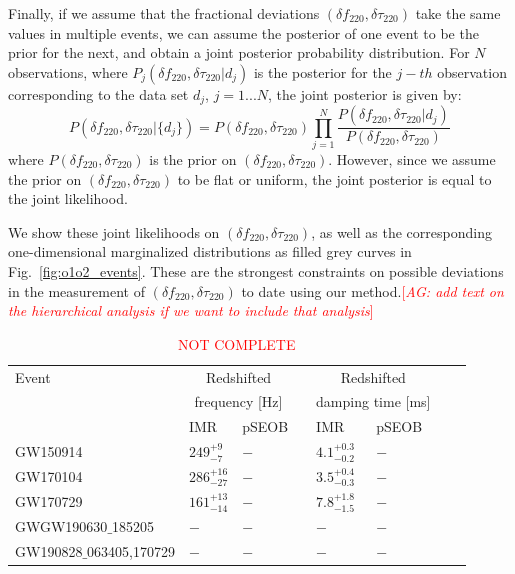 \documentclass[twocolumn,prd,aps,superscriptaddress,preprintnumbers,tightenlines,showpacs,nofootinbib,eqsecnum,amsfonts,amsmath]{revtex4-1}
\newcommand{\abhi}[1]{\textcolor{red}{[\textit{AG: #1}]}}
\newcommand{\df}[1]{\delta f_{\text{#1}}}
\newcommand{\dtau}[1]{\delta \tau_{\text{#1}}}
\begin{document}
Finally, if we assume that the fractional deviations $(\df{220}, \dtau{220})$ take the same values in multiple events, we can assume the posterior of one event to be the prior for the next, and obtain a joint posterior probability distribution. For $N$ observations, where $P_j(\df{220}, \dtau{220} | d_j)$ is the posterior for the $j-th$ observation corresponding to the data set $d_j$, $j=1...N$, the joint posterior is given by:
\begin{equation}
P(\df{220}, \dtau{220} | \{d_j\}) = P(\df{220}, \dtau{220}) \prod _{j=1}^N \frac{P(\df{220}, \dtau{220} | d_j) }{P(\df{220}, \dtau{220})}
\end{equation}
where $P(\df{220}, \dtau{220})$ is the prior on $(\df{220}, \dtau{220})$. However, since we assume the prior on $(\df{220}, \dtau{220})$ to be flat or uniform, the joint posterior is equal to the joint likelihood.

We show these joint likelihoods on $(\df{220}, \dtau{220})$, as well as the corresponding one-dimensional marginalized distributions as filled grey curves in Fig.~\ref{fig:o1o2_events}. These are the strongest constraints on possible deviations in the measurement of $(\df{220}, \dtau{220})$ to date using our method.\abhi{add text on the hierarchical analysis if we want to include that analysis}

\begin{table}
\begin{flushleft}
\begin{tabular}{llllllll}
\toprule
Event & \multicolumn{2}{c}{Redshifted} & \hphantom{X} & \multicolumn{2}{c}{Redshifted} \\
& \multicolumn{2}{c}{frequency [Hz]} & \hphantom{X} & \multicolumn{2}{c}{damping time [ms]} \\[0.075cm]
\hline
& IMR  & pSEOB & \hphantom{X} & IMR  & pSEOB \\
\hline

GW150914 &
$249^{+9}_{-7}$ &
$-$ &
\hphantom{X} &
$4.1^{+0.3}_{-0.2}$ &
$-$
\\[0.075cm]

GW170104 &
$286^{+16}_{-27}$ &
$-$ &
\hphantom{X} &
$3.5^{+0.4}_{-0.3}$ &
$-$
\\[0.075cm]

GW170729 &
$161^{+13}_{-14}$ &
$-$ &
\hphantom{X} &
$7.8^{+1.8}_{-1.5}$ &
$-$
\\[0.075cm]

GWGW190630$\_$185205 &
$-$ &
$-$ &
\hphantom{X} &
$-$ &
$-$
\\[0.075cm]

GW190828$\_$063405,170729 &
$-$ &
$-$ &
\hphantom{X} &
$-$ &
$-$
\\[0.075cm]
\hline
\bottomrule
\end{tabular}
\caption{\textcolor{red}{NOT COMPLETE}}
\label{tab:qnm_o1o2_results}
\end{flushleft}
\end{table}
\end{document}
